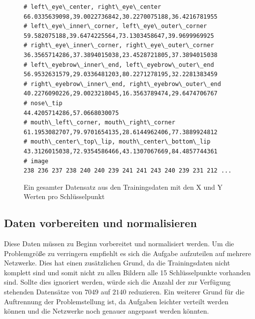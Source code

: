 \begin{figure}[ht!]
\lstset{language=Python}
	\begin{lstlisting}
# left\_eye\_center, right\_eye\_center
66.0335639098,39.0022736842,30.2270075188,36.4216781955
# left\_eye\_inner\_corner, left\_eye\_outer\_corner
59.582075188,39.6474225564,73.1303458647,39.9699969925
# right\_eye\_inner\_corner, right\_eye\_outer\_corner
36.3565714286,37.3894015038,23.4528721805,37.3894015038
# left\_eyebrow\_inner\_end, left\_eyebrow\_outer\_end
56.9532631579,29.0336481203,80.2271278195,32.2281383459
# right\_eyebrow\_inner\_end, right\_eyebrow\_outer\_end
40.2276090226,29.0023218045,16.3563789474,29.6474706767
# nose\_tip
44.4205714286,57.0668030075
# mouth\_left\_corner, mouth\_right\_corner
61.1953082707,79.9701654135,28.6144962406,77.3889924812
# mouth\_center\_top\_lip, mouth\_center\_bottom\_lip
43.3126015038,72.9354586466,43.1307067669,84.4857744361
# image
238 236 237 238 240 240 239 241 241 243 240 239 231 212 ...
\end{lstlisting}
	\caption{Ein gesamter Datensatz aus den Trainingsdaten mit den X und Y Werten pro Schlüsselpunkt}
	\label{fig:ausgangsdatenRoh}
\end{figure}

\subsection{Daten vorbereiten und normalisieren}

Diese Daten müssen zu Beginn vorbereitet und normalisiert werden. 
Um die Problemgröße zu verringern empfiehlt es sich die Aufgabe aufzuteilen auf mehrere Netzwerke. 
Dies hat einen zusätzlichen Grund, da die Trainingsdaten nicht komplett sind und somit nicht zu allen Bildern alle 15 Schlüsselpunkte vorhanden sind. 
Sollte dies ignoriert werden, würde sich die Anzahl der zur Verfügung stehenden Datensätze von $7049$ auf $2140$ reduzieren. 
Ein weiterer Grund für die Auftrennung der Problemstellung ist, da Aufgaben leichter verteilt werden können und die Netzwerke noch genauer angepasst werden könnten. \newline

